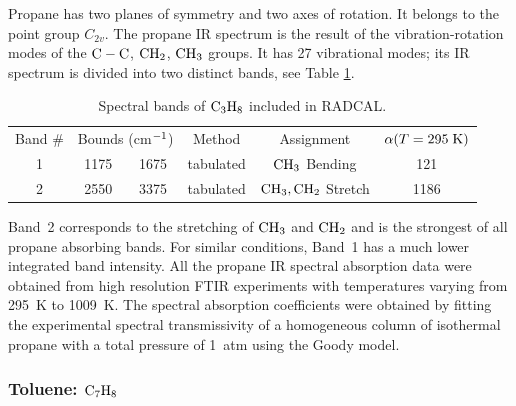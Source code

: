 Propane has two planes of symmetry and two axes of rotation. It belongs to the point group $C_{2v}$. The propane IR spectrum is the result of the vibration-rotation modes of the $\rm C-C$, $\rm CH_2$, $\rm CH_3$ groups. It has 27 vibrational modes; its IR spectrum is divided into two distinct bands, see Table \ref{Table::C3H8}.
\begin{table}[ht]
   \centering
   \caption{Spectral bands of $\rm C_3H_8$ included in RADCAL.}
   \vspace{0.1in}
   \label{Table::C3H8}
   \begin{tabular}{|c|c|c|c|c|c|}
    \hline
    Band \# & \multicolumn{2}{|l|}{Bounds (cm$\rm ^{-1}$) } & Method & Assignment & $\alpha(T=295 \; {\rm K})$ \\
    \cline{1-6}
    1 & 1175 & 1675 & tabulated &  $\rm CH_3$ Bending        & 121 \\
    2 & 2550 & 3375 & tabulated &  $\rm CH_3, CH_2$ Stretch  & 1186 \\
    \hline
   \end{tabular}
\end{table}
Band~2 corresponds to the stretching of $\rm CH_3$ and $\rm CH_2$ and is the strongest of all propane absorbing bands. For similar conditions, Band~1 has a much lower integrated band intensity. All the propane IR spectral absorption data were obtained from high resolution FTIR experiments with temperatures varying from 295~K to 1009~K. The spectral absorption coefficients were obtained by fitting the experimental spectral transmissivity of a homogeneous column of isothermal propane with a total pressure of 1~atm using the Goody model.

\subsubsection{Toluene: $\rm C_7H_8$}


